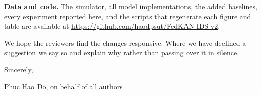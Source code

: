 \documentclass[11pt]{article}
\begin{document}
\textbf{Data and code.} The simulator, all model implementations, the added baselines, every
experiment reported here, and the scripts that regenerate each figure and table are
available at \url{https://github.com/haodpsut/FedKAN-IDS-v2}.

We hope the reviewers find the changes responsive. Where we have declined a suggestion we
say so and explain why rather than passing over it in silence.

\bigskip
Sincerely,

\bigskip
Phuc Hao Do, on behalf of all authors
\end{document}
